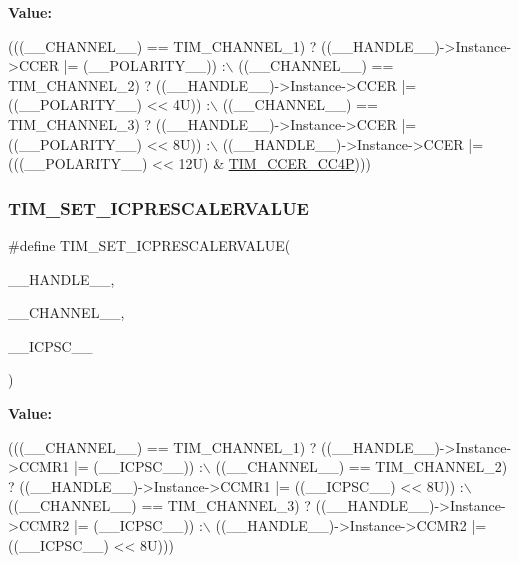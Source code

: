 {\bfseries Value\+:}
\begin{DoxyCode}
(((\_\_CHANNEL\_\_) == TIM\_CHANNEL\_1) ? ((\_\_HANDLE\_\_)->Instance->CCER |= (\_\_POLARITY\_\_)) :\(\backslash\)
 ((\_\_CHANNEL\_\_) == TIM\_CHANNEL\_2) ? ((\_\_HANDLE\_\_)->Instance->CCER |= ((\_\_POLARITY\_\_) << 4U)) :\(\backslash\)
 ((\_\_CHANNEL\_\_) == TIM\_CHANNEL\_3) ? ((\_\_HANDLE\_\_)->Instance->CCER |= ((\_\_POLARITY\_\_) << 8U)) :\(\backslash\)
 ((\_\_HANDLE\_\_)->Instance->CCER |= (((\_\_POLARITY\_\_) << 12U) & \mbox{\hyperlink{group___peripheral___registers___bits___definition_ga3faf23dc47e1b0877352d7f5a00f72e1}{TIM\_CCER\_CC4P}})))
\end{DoxyCode}
\mbox{\label{group___t_i_m___exported___macros_ga99724157918ca8b4d8babee1d8008dcb}} 
\subsubsection{\texorpdfstring{T\+I\+M\+\_\+\+S\+E\+T\+\_\+\+I\+C\+P\+R\+E\+S\+C\+A\+L\+E\+R\+V\+A\+L\+UE}{TIM\_SET\_ICPRESCALERVALUE}}
{\footnotesize\ttfamily \#define T\+I\+M\+\_\+\+S\+E\+T\+\_\+\+I\+C\+P\+R\+E\+S\+C\+A\+L\+E\+R\+V\+A\+L\+UE(\begin{DoxyParamCaption}\item[{}]{\+\_\+\+\_\+\+H\+A\+N\+D\+L\+E\+\_\+\+\_\+,  }\item[{}]{\+\_\+\+\_\+\+C\+H\+A\+N\+N\+E\+L\+\_\+\+\_\+,  }\item[{}]{\+\_\+\+\_\+\+I\+C\+P\+S\+C\+\_\+\+\_\+ }\end{DoxyParamCaption})}

{\bfseries Value\+:}
\begin{DoxyCode}
(((\_\_CHANNEL\_\_) == TIM\_CHANNEL\_1) ? ((\_\_HANDLE\_\_)->Instance->CCMR1 |= (\_\_ICPSC\_\_)) :\(\backslash\)
 ((\_\_CHANNEL\_\_) == TIM\_CHANNEL\_2) ? ((\_\_HANDLE\_\_)->Instance->CCMR1 |= ((\_\_ICPSC\_\_) << 8U)) :\(\backslash\)
 ((\_\_CHANNEL\_\_) == TIM\_CHANNEL\_3) ? ((\_\_HANDLE\_\_)->Instance->CCMR2 |= (\_\_ICPSC\_\_)) :\(\backslash\)
 ((\_\_HANDLE\_\_)->Instance->CCMR2 |= ((\_\_ICPSC\_\_) << 8U)))
\end{DoxyCode}
